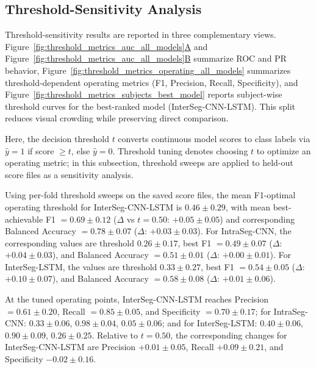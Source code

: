\subsection{Threshold-Sensitivity Analysis}
\label{sec:threshold_sensitivity_analysis}
Threshold-sensitivity results are reported in three complementary views. Figure~\hyperref[fig:threshold_metrics_auc_all_models]{\ref*{fig:threshold_metrics_auc_all_models}A} and Figure~\hyperref[fig:threshold_metrics_auc_all_models]{\ref*{fig:threshold_metrics_auc_all_models}B} summarize ROC and PR behavior, Figure~\hyperref[fig:threshold_metrics_operating_all_models]{\ref*{fig:threshold_metrics_operating_all_models}} summarizes threshold-dependent operating metrics (F1, Precision, Recall, Specificity), and Figure~\hyperref[fig:threshold_metrics_subjects_best_model]{\ref*{fig:threshold_metrics_subjects_best_model}} reports subject-wise threshold curves for the best-ranked model (InterSeg-CNN-LSTM). This split reduces visual crowding while preserving direct comparison.

Here, the decision threshold \(t\) converts continuous model scores to class labels via \(\hat{y}=1\) if score \(\ge t\), else \(\hat{y}=0\). Threshold tuning denotes choosing \(t\) to optimize an operating metric; in this subsection, threshold sweeps are applied to held-out score files as a sensitivity analysis.

Using per-fold threshold sweeps on the saved score files, the mean F1-optimal operating threshold for InterSeg-CNN-LSTM is \(0.46\pm0.29\), with mean best-achievable F1 \(=0.69\pm0.12\) (\(\Delta\) vs \(t=0.50\): \(+0.05\pm0.05\)) and corresponding Balanced Accuracy \(=0.78\pm0.07\) (\(\Delta\): \(+0.03\pm0.03\)). For IntraSeg-CNN, the corresponding values are threshold \(0.26\pm0.17\), best F1 \(=0.49\pm0.07\) (\(\Delta\): \(+0.04\pm0.03\)), and Balanced Accuracy \(=0.51\pm0.01\) (\(\Delta\): \(+0.00\pm0.01\)). For InterSeg-LSTM, the values are threshold \(0.33\pm0.27\), best F1 \(=0.54\pm0.05\) (\(\Delta\): \(+0.10\pm0.07\)), and Balanced Accuracy \(=0.58\pm0.08\) (\(\Delta\): \(+0.01\pm0.06\)).

At the tuned operating points, InterSeg-CNN-LSTM reaches Precision \(=0.61\pm0.20\), Recall \(=0.85\pm0.05\), and Specificity \(=0.70\pm0.17\); for IntraSeg-CNN: \(0.33\pm0.06\), \(0.98\pm0.04\), \(0.05\pm0.06\); and for InterSeg-LSTM: \(0.40\pm0.06\), \(0.90\pm0.09\), \(0.26\pm0.25\). Relative to \(t=0.50\), the corresponding changes for InterSeg-CNN-LSTM are Precision \(+0.01\pm0.05\), Recall \(+0.09\pm0.21\), and Specificity \(-0.02\pm0.16\).

